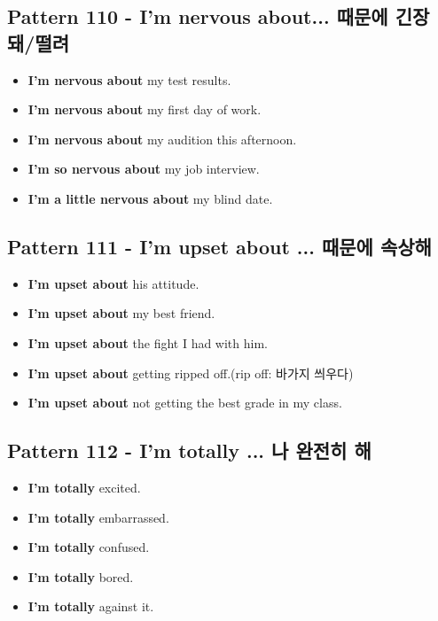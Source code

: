 \documentclass[11pt]{oblivoir}
\begin{document}
\subsection{Pattern 110 - I'm nervous about... \texttildelow 때문에 긴장돼/떨려}
\begin{itemize}
  \item \textbf{I'm nervous about} my test results.
  \item \textbf{I'm nervous about} my first day of work.
  \item \textbf{I'm nervous about} my audition this afternoon.
  \item \textbf{I'm so nervous about} my job interview.
  \item \textbf{I'm a little nervous about} my blind date.
\end{itemize}

\subsection{Pattern 111 - I'm upset about ... \texttildelow 때문에 속상해}
\begin{itemize}
  \item \textbf{I'm upset about} his attitude.
  \item \textbf{I'm upset about} my best friend.
  \item \textbf{I'm upset about} the fight I had with him.
  \item \textbf{I'm upset about} getting ripped off.(rip off: 바가지 씌우다)
  \item \textbf{I'm upset about} not getting the best grade in my class.
\end{itemize}

\subsection{Pattern 112 - I'm totally ... 나 완전히 \texttildelow 해}
\begin{itemize}
  \item \textbf{I'm totally} excited.
  \item \textbf{I'm totally} embarrassed.
  \item \textbf{I'm totally} confused.
  \item \textbf{I'm totally} bored.
  \item \textbf{I'm totally} against it.
\end{itemize}
\end{document}
